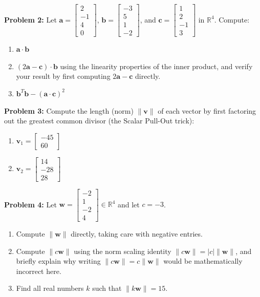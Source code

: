 \documentclass[11pt, letterpaper]{article}
\theoremstyle{definition}
\theoremstyle{remark}
\begin{document}
\textbf{Problem 2:} Let $\mathbf{a} = \begin{bmatrix} 2 \\ -1 \\ 4 \\ 0 \end{bmatrix}$, $\mathbf{b} = \begin{bmatrix} -3 \\ 5 \\ 1 \\ -2 \end{bmatrix}$, and $\mathbf{c} = \begin{bmatrix} 1 \\ 2 \\ -1 \\ 3 \end{bmatrix}$ in $\mathbb{R}^4$. Compute:
\begin{enumerate}[label=(\alph*)]
    \item $\mathbf{a} \cdot \mathbf{b}$
    \item $(2\mathbf{a} - \mathbf{c}) \cdot \mathbf{b}$ using the linearity properties of the inner product, and verify your result by first computing $2\mathbf{a} - \mathbf{c}$ directly.
    \item $\mathbf{b}^T \mathbf{b} - (\mathbf{a} \cdot \mathbf{c})^2$
\end{enumerate}

\textbf{Problem 3:} Compute the length (norm) $\|\mathbf{v}\|$ of each vector by first factoring out the greatest common divisor (the Scalar Pull-Out trick):
\begin{enumerate}[label=(\alph*)]
    \item $\mathbf{v}_1 = \begin{bmatrix} -45 \\ 60 \end{bmatrix}$
    \item $\mathbf{v}_2 = \begin{bmatrix} 14 \\ -28 \\ 28 \end{bmatrix}$
\end{enumerate}

\textbf{Problem 4:} Let $\mathbf{w} = \begin{bmatrix} -2 \\ 1 \\ -2 \\ 4 \end{bmatrix} \in \mathbb{R}^4$ and let $c = -3$.
\begin{enumerate}[label=(\alph*)]
    \item Compute $\|\mathbf{w}\|$ directly, taking care with negative entries.
    \item Compute $\|c\mathbf{w}\|$ using the norm scaling identity $\|c\mathbf{w}\| = |c|\|\mathbf{w}\|$, and briefly explain why writing $\|c\mathbf{w}\| = c\|\mathbf{w}\|$ would be mathematically incorrect here.
    \item Find all real numbers $k$ such that $\|k\mathbf{w}\| = 15$.
\end{enumerate}
\end{document}
